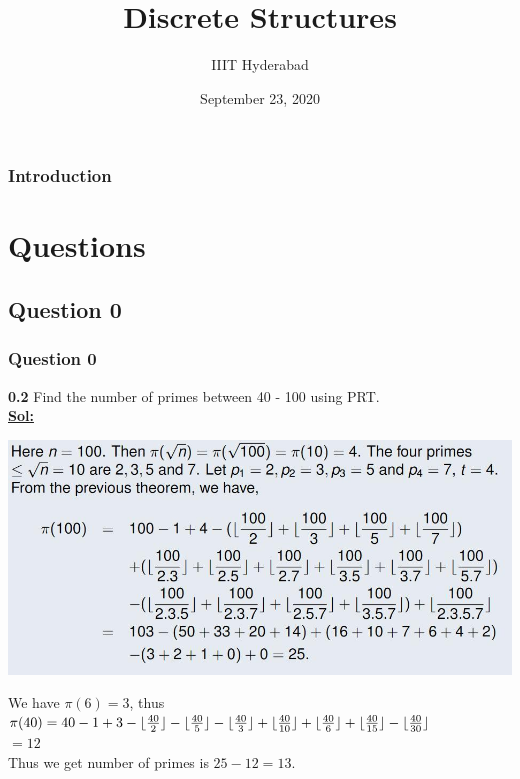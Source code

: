 \documentclass[xcolor=svgnames]{beamer}
\title[Discrete Structures]{Discrete Structures} %
\author{IIIT Hyderabad} %
\institute[] %
{
Monsoon 2020 \\ %
\medskip
\textit{Tutorial 3} %
}
\date{September 23, 2020} %
\DeclarePairedDelimiter\floor{\lfloor}{\rfloor}
\begin{document}
\begin{frame}
\titlepage %
\end{frame}

\begin{frame}
\frametitle{Introduction} %
\tableofcontents %
\end{frame}



\section{Questions}

\subsection{Question 0}
\begin{frame}
\frametitle{Question 0}
\textbf{0.2} Find the number of primes between 40 - 100 using PRT.
\\ \textbf{\underline{Sol:}} 
\begin{center}
    \includegraphics[width=0.8\linewidth]{photo_2020-09-23_00-54-28.jpg}
\end{center}
We have $\pi(6) = 3$, thus $\pi(40) = 40 - 1 + 3 - \floor{\frac{40}{2}} - \floor{\frac{40}{5}} - \floor{\frac{40}{3}} + \floor{\frac{40}{10}} + \floor{\frac{40}{6}} + \floor{\frac{40}{15}} - \floor{\frac{40}{30}}$ 
\\ $= 12$
\\ Thus we get number of primes is $25 - 12 = 13$.

\end{frame}
\end{document}
